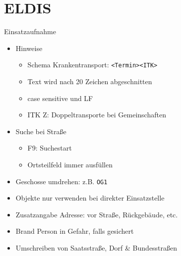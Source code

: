 \section{ELDIS}
\begin{sectionbox}{Einsatzaufnahme}
    \begin{itemize}
        \item Hinweise
        \begin{itemize}
            \item Schema Krankentransport: \texttt{<Termin><ITK>}
            \item Text wird nach 20 Zeichen abgeschnitten
            \item case sensitive und LF
            \item ITK Z: Doppeltransporte bei Gemeinschaften
        \end{itemize}
        \item Suche bei Straße
        \begin{itemize}
            \item F9: Suchestart
            \item Ortsteilfeld immer ausfüllen
        \end{itemize}
        \item Geschosse umdrehen: z.B. \texttt{OG1}
        \item Objekte nur verwenden bei direkter Einsatzstelle
        \item Zusatzangabe Adresse: vor Straße, Rückgebäude, etc.
        \item Brand Person in Gefahr, falls gesichert
        \item Umschreiben von Saatsstraße, Dorf \& Bundesstraßen
    \end{itemize}
\end{sectionbox}